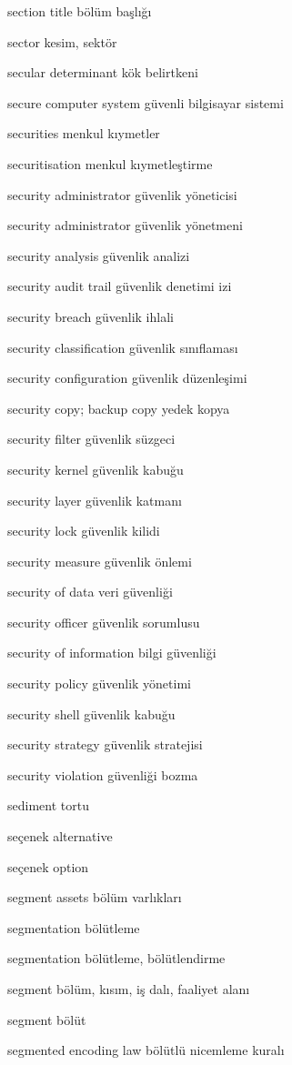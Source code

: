 \documentclass[12pt,fleqn]{article}\usepackage{../../common}
\begin{document}
section title bölüm başlığı

sector kesim, sektör

secular determinant kök belirtkeni

secure computer system güvenli bilgisayar sistemi

securities menkul kıymetler

securitisation menkul kıymetleştirme

security administrator güvenlik yöneticisi

security administrator güvenlik yönetmeni

security analysis güvenlik analizi

security audit trail güvenlik denetimi izi

security breach güvenlik ihlali

security classification güvenlik sınıflaması

security configuration güvenlik düzenleşimi

security copy; backup copy yedek kopya

security filter güvenlik süzgeci

security kernel güvenlik kabuğu

security layer güvenlik katmanı

security lock güvenlik kilidi

security measure güvenlik önlemi

security of data veri güvenliği

security officer güvenlik sorumlusu

security of information bilgi güvenliği

security policy güvenlik yönetimi

security shell güvenlik kabuğu

security strategy güvenlik stratejisi

security violation güvenliği bozma

sediment tortu

seçenek alternative

seçenek option

segment assets bölüm varlıkları

segmentation bölütleme

segmentation bölütleme, bölütlendirme

segment bölüm, kısım, iş dalı, faaliyet alanı

segment bölüt

segmented encoding law bölütlü nicemleme kuralı
\end{document}
